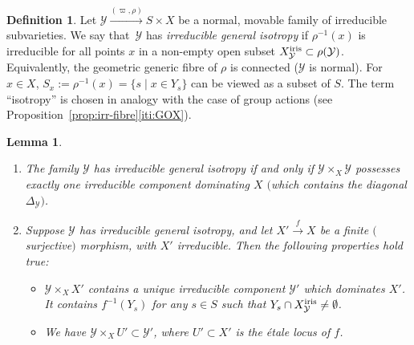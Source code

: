 \documentclass[10pt,a4paper]{article}
\numberwithin{equation}{section}
\newtheorem{m-lemma}[m-theorem]{Lemma}
\theoremstyle{definition}
\newtheorem{m-definition}[m-theorem]{Definition}
\theoremstyle{remark}
\let\cal\mathcal
\let\srel\stackrel
\newcommand{\iris}{{\rm iris}}
\newcommand{\cY}{{\cal Y}}
\newcommand{\xx}{x}
\newcommand{\XX}{X}
\newcommand{\YY}{Y}
\begin{document}
\begin{m-definition}\label{def:irr-fibre}
Let $\cY\srel{(\varpi,\rho)}{\longrightarrow}S\times\XX$ be a normal, movable family of irreducible subvarieties. We say that~$\cY$ has {\em irreducible general isotropy} if  $\rho^{-1}(\xx)$ is irreducible for all points $\xx$ in a non-empty open subset $\XX^\iris_\cY\subset\rho(\cY)$. Equivalently, the geometric generic fibre of $\rho$ is connected ($\cY$ is normal). 
For $\xx\in\XX$, $S_\xx:=\rho^{-1}(\xx)=\{ s\mid \xx\in\YY_s \}$ can be viewed as a subset of $S$. The term ``isotropy'' is chosen in analogy with the case of group actions (see Proposition~\ref{prop:irr-fibre}\ref{iti:GOX}). 
\end{m-definition}


\begin{m-lemma}\label{lm:irr-fibre}\leavevmode
\begin{enumerate}
\item \label{l:if-1}
The family $\cY$ has irreducible general isotropy if and only if  $\cY\times_\XX\cY$ possesses exactly one irreducible component dominating $\XX$ $($which contains the diagonal $\Delta_\cY)$.
\item \label{l:if-2}
Suppose $\cY$ has irreducible general isotropy, and let $\XX'\srel{f}{\to}\XX$ be a finite $($surjective$)$ morphism, with $\XX'$ irreducible. Then the following properties hold true: 
\begin{itemize}
\item $\cY\times_\XX\XX'$ contains a unique irreducible component $\cY'$ which dominates $\XX'$. It contains $f^{-1}(\YY_s)$ for any $s\in S$ such that $\YY_s\cap\XX^\iris_\cY\neq\emptyset$.
\item We have $\cY\times_\XX U'\subset\cY'$, where $U'\subset\XX'$ is the \'etale locus of $f$. 
\end{itemize}
\end{enumerate}
\end{m-lemma}
\end{document}
